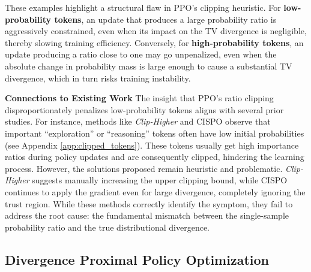 These examples highlight a structural flaw in PPO's clipping heuristic. For \textbf{low-probability tokens}, an update that produces a large probability ratio is aggressively constrained, even when its impact on the TV divergence is negligible, thereby slowing training efficiency. Conversely, for \textbf{high-probability tokens}, an update producing a ratio close to one may go unpenalized, even when the absolute change in probability mass is large enough to cause a substantial TV divergence, which in turn risks training instability. 


\textbf{Connections to Existing Work} 
The insight that PPO's ratio clipping disproportionately penalizes low-probability tokens aligns with several prior studies. For instance, methods like \textit{Clip-Higher} \citep{yu2025dapo} and CISPO \citep{chen2025minimax} observe that important ``exploration'' or ``reasoning'' tokens often have low initial probabilities (see Appendix \ref{app:clipped_tokens}). These tokens usually get high importance ratios during policy updates and are consequently clipped, hindering the learning process.  
However, the solutions proposed remain heuristic and problematic. \textit{Clip-Higher} suggests manually increasing the upper clipping bound, while CISPO continues to apply the gradient even for large divergence, completely ignoring the trust region. While these methods correctly identify the symptom, they fail to address the root cause: the fundamental mismatch between the single-sample probability ratio and the true distributional divergence.


\subsection{Divergence Proximal Policy Optimization}  
  
